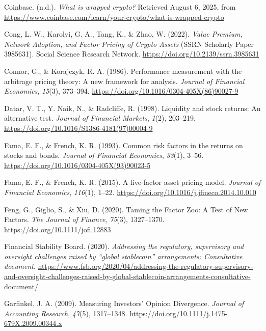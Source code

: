 \documentclass[
  12pt,
  a4paper,
  openany]{scrbook}
\newlength{\cslhangindent}
\newenvironment{CSLReferences}[2] %
 {\begin{list}{}{%
  \setlength{\itemindent}{0pt}
  \setlength{\leftmargin}{0pt}
  \setlength{\parsep}{0pt}
  \ifodd #1
   \setlength{\leftmargin}{\cslhangindent}
   \setlength{\itemindent}{-1\cslhangindent}
  \fi
  \setlength{\itemsep}{#2\baselineskip}}}
 {\end{list}}
\begin{document}
\begin{CSLReferences}{1}{0}
Coinbase. (n.d.). \emph{What is wrapped crypto?} Retrieved August 6,
2025, from
\url{https://www.coinbase.com/learn/your-crypto/what-is-wrapped-crypto}

Cong, L. W., Karolyi, G. A., Tang, K., \& Zhao, W. (2022). \emph{Value
Premium, Network Adoption, and Factor Pricing of Crypto Assets} (SSRN
Scholarly Paper 3985631). Social Science Research Network.
\url{https://doi.org/10.2139/ssrn.3985631}

Connor, G., \& Korajczyk, R. A. (1986). Performance measurement with the
arbitrage pricing theory: A new framework for analysis. \emph{Journal of
Financial Economics}, \emph{15}(3), 373--394.
\url{https://doi.org/10.1016/0304-405X(86)90027-9}

Datar, V. T., Y. Naik, N., \& Radcliffe, R. (1998). Liquidity and stock
returns: An alternative test. \emph{Journal of Financial Markets},
\emph{1}(2), 203--219.
\url{https://doi.org/10.1016/S1386-4181(97)00004-9}

Fama, E. F., \& French, K. R. (1993). Common risk factors in the returns
on stocks and bonds. \emph{Journal of Financial Economics},
\emph{33}(1), 3--56. \url{https://doi.org/10.1016/0304-405X(93)90023-5}

Fama, E. F., \& French, K. R. (2015). A five-factor asset pricing model.
\emph{Journal of Financial Economics}, \emph{116}(1), 1--22.
\url{https://doi.org/10.1016/j.jfineco.2014.10.010}

Feng, G., Giglio, S., \& Xiu, D. (2020). Taming the Factor Zoo: A Test
of New Factors. \emph{The Journal of Finance}, \emph{75}(3), 1327--1370.
\url{https://doi.org/10.1111/jofi.12883}

Financial Stability Board. (2020). \emph{Addressing the regulatory,
supervisory and oversight challenges raised by {``global stablecoin''}
arrangements: Consultative document}.
\url{https://www.fsb.org/2020/04/addressing-the-regulatory-supervisory-and-oversight-challenges-raised-by-global-stablecoin-arrangements-consultative-document/}

Garfinkel, J. A. (2009). Measuring Investors' Opinion Divergence.
\emph{Journal of Accounting Research}, \emph{47}(5), 1317--1348.
\url{https://doi.org/10.1111/j.1475-679X.2009.00344.x}


\end{CSLReferences}
\end{document}
